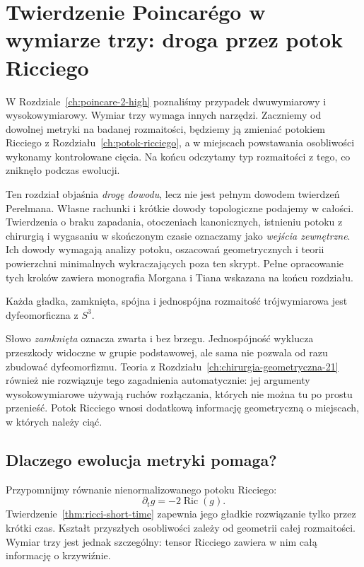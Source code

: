 \chapter{Twierdzenie Poincarégo w wymiarze trzy: droga przez potok Ricciego}
\label{ch:poincare-trzy}

W Rozdziale~\ref{ch:poincare-2-high} poznaliśmy przypadek
dwuwymiarowy i wysokowymiarowy. Wymiar trzy wymaga innych
narzędzi. Zaczniemy od dowolnej metryki na badanej
rozmaitości, będziemy ją zmieniać potokiem Ricciego
z Rozdziału~\ref{ch:potok-ricciego}, a w miejscach powstawania
osobliwości wykonamy kontrolowane cięcia. Na końcu
odczytamy typ rozmaitości z tego, co zniknęło podczas
ewolucji.

Ten rozdział objaśnia \emph{drogę dowodu}, lecz nie jest
pełnym dowodem twierdzeń Perelmana. Własne rachunki i krótkie
dowody topologiczne podajemy w całości. Twierdzenia o braku
zapadania, otoczeniach kanonicznych, istnieniu potoku
z chirurgią i wygasaniu w skończonym czasie oznaczamy
jako \emph{wejścia zewnętrzne}. Ich dowody wymagają analizy
potoku, oszacowań geometrycznych i teorii powierzchni
minimalnych wykraczających poza ten skrypt. Pełne opracowanie
tych kroków zawiera monografia Morgana i Tiana wskazana
na końcu rozdziału.

\begin{twierdzenie}
\label{thm:poincare-trzy}
Każda gładka, zamknięta, spójna i jednospójna
rozmaitość trójwymiarowa jest dyfeomorficzna z $S^3$.
\end{twierdzenie}

Słowo \emph{zamknięta} oznacza zwarta i bez brzegu.
Jednospójność wyklucza przeszkody widoczne w grupie
podstawowej, ale sama nie pozwala od razu zbudować
dyfeomorfizmu. Teoria z Rozdziału~\ref{ch:chirurgia-geometryczna-21}
również nie rozwiązuje tego zagadnienia automatycznie:
jej argumenty wysokowymiarowe używają ruchów rozłączania,
których nie można tu po prostu przenieść. Potok Ricciego
wnosi dodatkową informację geometryczną o miejscach,
w których należy ciąć.

\section{Dlaczego ewolucja metryki pomaga?}
\label{sec:poincare3-pierwsze-rachunki}

Przypomnijmy równanie nienormalizowanego potoku Ricciego:
\begin{equation}\label{eq:poincare3-ricci}
 \partial_tg=-2\operatorname{Ric}(g).
\end{equation}
Twierdzenie~\ref{thm:ricci-short-time} zapewnia jego
gładkie rozwiązanie tylko przez krótki czas. Kształt
przyszłych osobliwości zależy od geometrii całej
rozmaitości. Wymiar trzy jest jednak szczególny: tensor
Ricciego zawiera w nim całą informację o krzywiźnie.

